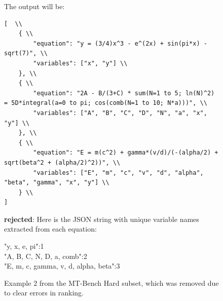 \begin{figure}[t]
{\begin{minipage}{0.95\linewidth}
The output will be:

\begin{lstlisting}
[  \\
    { \\
        "equation": "y = (3/4)x^3 - e^(2x) + sin(pi*x) - sqrt(7)", \\
        "variables": ["x", "y"] \\
    }, \\
    { \\
        "equation": "2A - B/(3+C) * sum(N=1 to 5; ln(N)^2) = 5D*integral(a=0 to pi; cos(comb(N=1 to 10; N*a)))", \\
        "variables": ["A", "B", "C", "D", "N", "a", "x", "y"] \\
    }, \\
    { \\
        "equation": "E = m(c^2) + gamma*(v/d)/(-(alpha/2) + sqrt(beta^2 + (alpha/2)^2))", \\
        "variables": ["E", "m", "c", "v", "d", "alpha", "beta", "gamma", "x", "y"] \\
    } \\
]
\end{lstlisting}

\vspace{1em}

\textbf{rejected}: Here is the JSON string with unique variable names extracted from each equation:

{"y, x, e, pi":1}\\
{"A, B, C, N, D, a, comb":2} \\
{"E, m, c, gamma, v, d, alpha, beta":3}
\end{minipage}
}
\caption{Example 2 from the MT-Bench Hard subset, which was removed due to clear errors in ranking.}
\label{fig:mtbench_4}
\end{figure}

